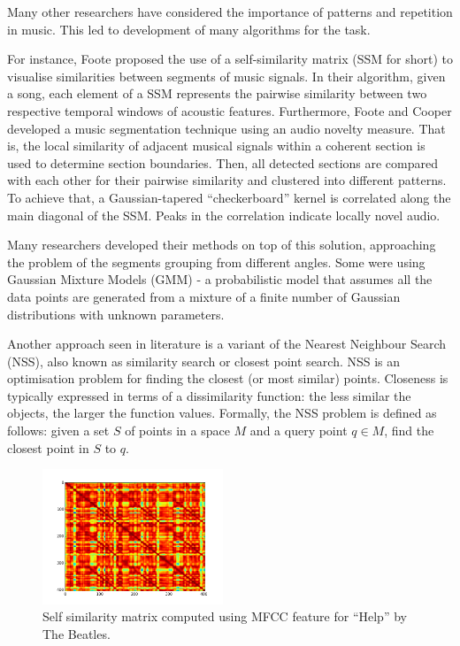 Many other researchers have considered the importance of patterns and repetition in music. This led to development of many algorithms for the task.


For instance, Foote \cite{Foote} proposed the use of a self-similarity matrix (SSM for short) to visualise similarities between segments of music signals. In their algorithm, given a song, each element of a SSM represents the pairwise similarity between two respective temporal windows of acoustic features. Furthermore, Foote and Cooper \cite{FooteCooper} developed a music segmentation technique using an audio novelty measure. That is, the local similarity of adjacent musical signals within a coherent section is used to determine section boundaries. Then, all detected sections are compared with each other for their pairwise similarity and clustered into different patterns. To achieve that, a Gaussian-tapered ``checkerboard'' kernel is correlated along the main diagonal of the SSM.  Peaks in the correlation indicate locally novel audio.

Many researchers developed their methods on top of this solution, approaching the problem of the segments grouping from different angles. Some were using Gaussian Mixture Models (GMM) - a probabilistic model that assumes all the data points are generated from a mixture of a finite number of Gaussian distributions with unknown parameters. 

Another approach seen in literature is a variant of the Nearest Neighbour Search (NSS), also known as similarity search or closest point search. NSS is an optimisation problem for finding the closest (or most similar) points. Closeness is typically expressed in terms of a dissimilarity function: the less similar the objects, the larger the function values. Formally, the NSS problem is defined as follows: given a set $S$ of points in a space $M$ and a query point $q \in M$, find the closest point in $S$ to $q$.


\begin{figure}
  \begin{center}
    \includegraphics[width=0.48\textwidth]{Figures/mfcc_no_log_sync}
  \end{center}
  \caption{Self similarity matrix computed using MFCC feature for ``Help'' by The Beatles.}
  \label{fig:SSMbach}
\end{figure}

